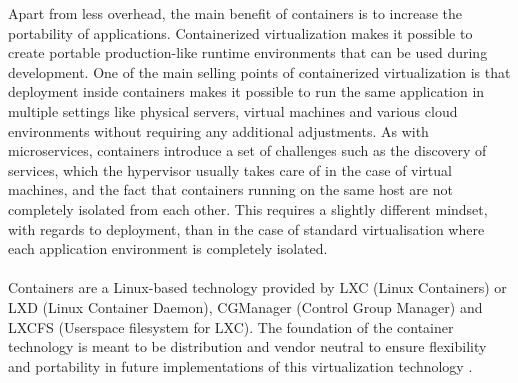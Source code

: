 \noindent
Apart from less overhead, the main benefit of containers is to increase the portability of applications. Containerized virtualization makes it possible to create portable production-like runtime environments that can be used during development. One of the main selling points of containerized virtualization is that deployment inside containers makes it possible to run the same application in multiple settings like physical servers, virtual machines and various cloud environments without requiring any additional adjustments. As with microservices, containers introduce a set of challenges such as the discovery of services, which the hypervisor usually takes care of in the case of virtual machines, and the fact that containers running on the same host are not completely isolated from each other. This requires a slightly different mindset, with regards to deployment, than in the case of standard virtualisation where each application environment is completely isolated.
\\ \\
Containers are a Linux-based technology provided by LXC (Linux Containers) or LXD (Linux Container Daemon), CGManager (Control Group Manager) and LXCFS (Userspace filesystem for LXC). The foundation of the container technology is meant to be distribution and vendor neutral to ensure flexibility and portability in future implementations of this virtualization technology \cite{linuxContainers}.


